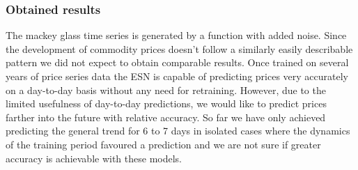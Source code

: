 \subsubsection*{Obtained results}
The mackey glass time series is generated by a function with added noise. Since the development of commodity prices doesn't follow a similarly easily describable pattern we did not expect to obtain comparable results. Once trained on several years of price series data the ESN is capable of predicting prices very accurately on a day-to-day basis without any need for retraining. However, due to the limited usefulness of day-to-day predictions, we would like to predict prices farther into the future with relative accuracy. So far we have only achieved predicting the general trend for 6 to 7 days in isolated cases where the dynamics of the training period favoured a prediction and we are not sure if greater accuracy is achievable with these models. %

